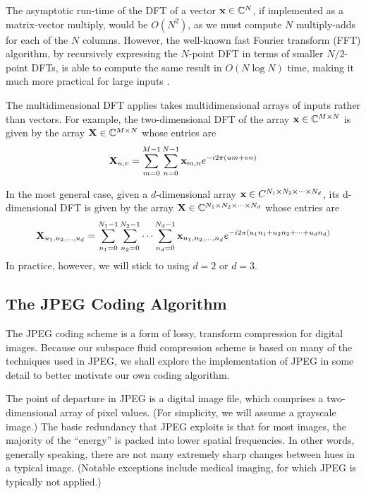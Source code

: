 The asymptotic run-time of the DFT of a vector $\mathbf{x} \in \mathbb{C}^N$, if implemented as a matrix-vector multiply, would be $O(N^2)$, as we must compute $N$ multiply-adds for each of the $N$ columns. However, the well-known fast Fourier transform (FFT) algorithm, by recursively expressing the $N$-point DFT in terms of smaller $N/2$-point DFTs, is able to compute the same result in $O(N \log{N})$ time, making it much more practical for large inputs \cite{1965-cooley}.

The multidimensional DFT applies takes multidimensional arrays of inputs rather than vectors. For example, the two-dimensional DFT of the array $\mathbf{x} \in \mathbb{C}^{M \times N}$ is given by
the array $\mathbf{X} \in \mathbb{C}^{M \times N}$ whose entries are
\begin{equation}
	\mathbf{X}_{u,v} = \sum_{m=0}^{M-1} \sum_{n=0}^{N-1} \mathbf{x}_{m, n} e^{-i 2 \pi \left(um + vn\right)}
\end{equation}

In the most general case, given a $d$-dimensional array $\mathbf{x} \in C^{N_1 \times N_2 \times \cdots \times N_d}$, its d-dimensional DFT is given by the array $\mathbf{X} \in \mathbb{C}^{N_1 \times N_2 \times \cdots \times N_d}$ whose entries are
\begin{equation}
	\mathbf{X}_{u_1, u_2, \dots, u_d} = \sum_{n_1=0}^{N_1-1} \sum_{n_2=0}^{N_2-1} \cdots \sum_{n_d = 0}^{N_d -1} \mathbf{x}_{n_1, n_2, \dots, n_d} e^{-i 2 \pi \left(u_1 n_1 + u_2 n_2 + \cdots + u_d n_d\right)}
\end{equation}
In practice, however, we will stick to using $d=2$ or $d=3$.
\subsection{The JPEG Coding Algorithm} \label{sec:jpeg}
The JPEG coding scheme is a form of lossy, transform compression for digital images. Because our subspace fluid compression scheme is based on many of the techniques used in JPEG, we shall explore the implementation of JPEG in some detail to better motivate our own coding algorithm. 

The point of departure in JPEG is a digital image file, which comprises a two-dimensional array of pixel values. (For simplicity, we will assume a grayscale image.) The basic redundancy that JPEG exploits is that for most images, the majority of the ``energy'' is packed into lower spatial frequencies. In other words, generally speaking, there are not many extremely sharp changes between hues in a typical image. (Notable exceptions include medical imaging, for which JPEG is typically not applied.) 


